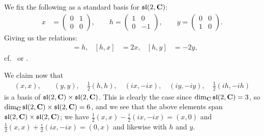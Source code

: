 We fix the following as a standard basis for $\mathfrak{sl}(2,\mathbf{C})$:
\begin{align}\label{eq:xhy}
  x&=
     \begin{pmatrix}
       0 & 1 \\ 0 & 0
     \end{pmatrix}, \qquad h =
                    \begin{pmatrix}
                      1 & 0 \\ 0 & -1
                    \end{pmatrix}, \qquad y =
                                   \begin{pmatrix}
                                     0 & 0 \\ 1 & 0
                                   \end{pmatrix}.
\end{align}
Giving us the relations:
\begin{align}
  [x,y]&=h, & [h,x]&=2x, & [h,y]&=-2y, \label{eq:sl2rels}
\end{align}
cf.\ \cite[35]{jantzen} or \cite[6]{humphrey}.

We claim now that
\begin{align*}
  (x,x),& \quad (y,y), \quad \tfrac{1}{2}(h,h), \quad (ix,-ix), \quad (iy,-iy), \quad \tfrac{1}{2}(ih,-ih)
\end{align*}
is a basis of $\mathfrak{sl}(2,\mathbf{C})\times \mathfrak{sl}(2,\mathbf{C})$. This is clearly the case since $\dim_{\mathbf{C}} \mathfrak{sl}(2,\mathbf{C}) = 3$, so $\dim_{\mathbf{C}} \mathfrak{sl}(2,\mathbf{C})\times \mathfrak{sl}(2,\mathbf{C}) = 6$, and we see that the above elements span $\mathfrak{sl}(2,\mathbf{C})\times \mathfrak{sl}(2,\mathbf{C})$; we have $\tfrac{1}{2}(x,x)-\tfrac{i}{2}(ix,-ix)=(x,0)$ and $\tfrac{1}{2}(x,x)+\tfrac{i}{2}(ix,-ix)=(0,x)$ and likewise with $h$ and $y$. 

